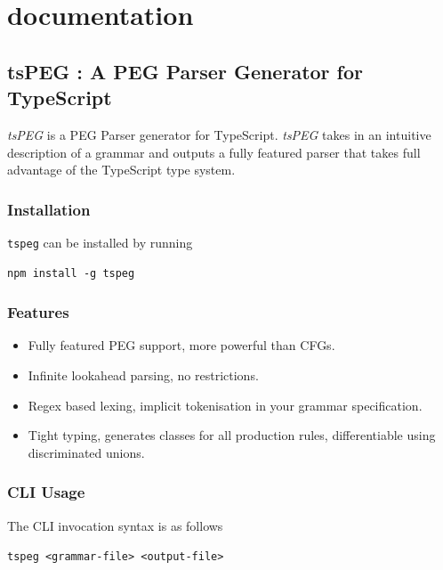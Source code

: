 \chapter{\tsPEG{} documentation}
\label{tspegdocs}

\section{tsPEG : A PEG Parser Generator for
TypeScript}\label{tspeg-a-peg-parser-generator-for-typescript}

\emph{tsPEG} is a PEG Parser generator for TypeScript. \emph{tsPEG}
takes in an intuitive description of a grammar and outputs a fully
featured parser that takes full advantage of the TypeScript type system.

\subsection{Installation}\label{installation}

\texttt{tspeg} can be installed by running

\begin{verbatim}
npm install -g tspeg
\end{verbatim}

\subsection{Features}\label{features}

\begin{itemize}

\item
  Fully featured PEG support, more powerful than CFGs.
\item
  Infinite lookahead parsing, no restrictions.
\item
  Regex based lexing, implicit tokenisation in your grammar
  specification.
\item
  Tight typing, generates classes for all production rules,
  differentiable using discriminated unions.
\end{itemize}

\subsection{CLI Usage}\label{cli-usage}

The CLI invocation syntax is as follows

\texttt{tspeg\ \textless{}grammar-file\textgreater{}\ \textless{}output-file\textgreater{}}

